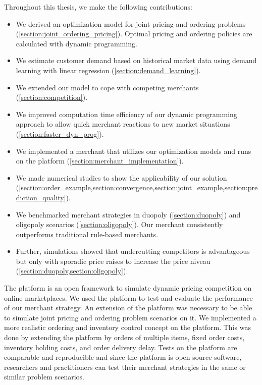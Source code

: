 Throughout this thesis, we make the following contributions:
\begin{itemize}
	\item We derived an optimization model for joint pricing and ordering problems (\cref{section:joint_ordering_pricing}). Optimal pricing and ordering policies are calculated with dynamic programming.
	\item We estimate customer demand based on historical market data using demand learning with linear regression (\cref{section:demand_learning}).
	\item We extended our model to cope with competing merchants (\cref{section:competition}).
	\item We improved computation time efficiency of our dynamic programming approach to allow quick merchant reactions to new market situations (\cref{section:faster_dyn_prog}).
	\item We implemented a merchant that utilizes our optimization models and runs on the  \pricewars platform (\cref{section:merchant_implementation}).
	\item We made numerical studies to show the applicability of our solution (\cref{section:order_example,section:convergence,section:joint_example,section:prediction_quality}).
	\item We benchmarked merchant strategies in duopoly (\cref{section:duopoly}) and oligopoly scenarios (\cref{section:oligopoly}). Our merchant consistently outperforms traditional rule-based merchants.
	\item Further, simulations showed that undercutting competitors is advantageous but only with sporadic price raises to increase the price niveau (\cref{section:duopoly,section:oligopoly}).
\end{itemize}

The \pricewars platform is an open framework to simulate dynamic pricing competition on online marketplaces.
We used the platform to test and evaluate the performance of our merchant strategy.
An extension of the platform was necessary to be able to simulate joint pricing and ordering problem scenarios on it.
We implemented a more realistic ordering and inventory control concept on the \pricewars platform.
This was done by extending the platform by orders of multiple items, fixed order costs, inventory holding costs, and order delivery delay.
Tests on the platform are comparable and reproducible and since the platform is open-source software, researchers and practitioners can test their merchant strategies in the same or similar problem scenarios.




